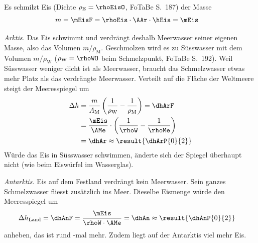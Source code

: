 Es schmilzt Eis (Dichte $\rho_\text{E} = \rhoEisO$, FoTaBe S.~187) der Masse
\begin{align}
 m &= \mEisF = \rhoEis\cdot\AAr\cdot\hEis = \mEis
\end{align}

\emph{Arktis.} Das Eis schwimmt und verdrängt deshalb Meerwasser seiner eigenen Masse, also das Volumen $m/\rho_\text{M}$. Geschmolzen wird es zu Süsswasser mit dem Volumen $m/\rho_\text{W}$ ($\rho_\text{W} = \rhoWO$ beim Schmelzpunkt, FoTaBe S.~192). Weil Süsswasser weniger dicht ist als Meerwasser, braucht das Schmelzwasser etwas mehr Platz als das verdrängte Meerwasser. Verteilt auf die Fläche der Weltmeere steigt der Meeresspiegel um
\begin{align}
 \Delta h &= \frac{m}{A_\text{M}}\left(\frac{1}{\rho_\text{W}}-\frac{1}{\rho_\text{M}}\right) = \dhArF \\
   &= \frac{\mEis}{\AMe}\cdot\left(\frac{1}{\rhoW}-\frac{1}{\rhoMe}\right) \\
   &= \dhAr \approx \result{\dhArP{0}{2}}
\end{align}
Würde das Eis in Süsswasser schwimmen, änderte sich der Spiegel überhaupt nicht (wie beim Eiswürfel im Wasserglas).

\emph{Antarktis.} Eis auf dem Festland verdrängt kein Meerwasser. Sein ganzes Schmelzwasser fliesst zusätzlich ins Meer. Dieselbe Eismenge würde den Meeresspiegel um
\begin{align}
 \Delta h_\text{Land} &= \dhAnF = \frac{\mEis}{\rhoW\cdot\AMe} = \dhAn \approx \result{\dhAnP{0}{2}}
\end{align}
anheben, das ist rund -mal mehr. Zudem liegt auf der Antarktis viel mehr Eis.
